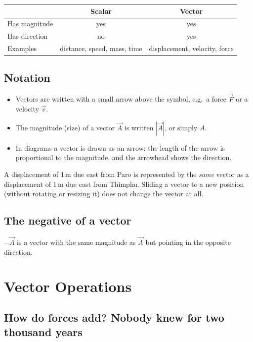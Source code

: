 \begin{center}
\begin{tabular}{lcc}
  \toprule
               & \textbf{Scalar} & \textbf{Vector} \\
  \midrule
  Has magnitude & yes & yes \\
  Has direction & no  & yes \\
  Examples & distance, speed, mass, time & displacement, velocity, force \\
  \bottomrule
\end{tabular}
\end{center}

\subsection{Notation}
\begin{itemize}
  \item Vectors are written with a small arrow above the symbol, e.g.\ a force $\vec{F}$ or a velocity $\vec{v}$.
  \item The magnitude (size) of a vector $\vec{A}$ is written $|\vec{A}|$, or simply $A$.
  \item In diagrams a vector is drawn as an arrow: the length of the arrow is proportional to the magnitude, and the arrowhead shows the direction.
\end{itemize}

\begin{keybox}
A displacement of 1\,m due east from Paro is represented by the \emph{same} vector as a
displacement of 1\,m due east from Thimphu. Sliding a vector to a new position (without
rotating or resizing it) does not change the vector at all.
\end{keybox}

\subsection{The negative of a vector}
$-\vec{A}$ is a vector with the same magnitude as $\vec{A}$ but pointing in the opposite direction.


\section{Vector Operations}

\subsection*{How do forces add? Nobody knew for two thousand years}

